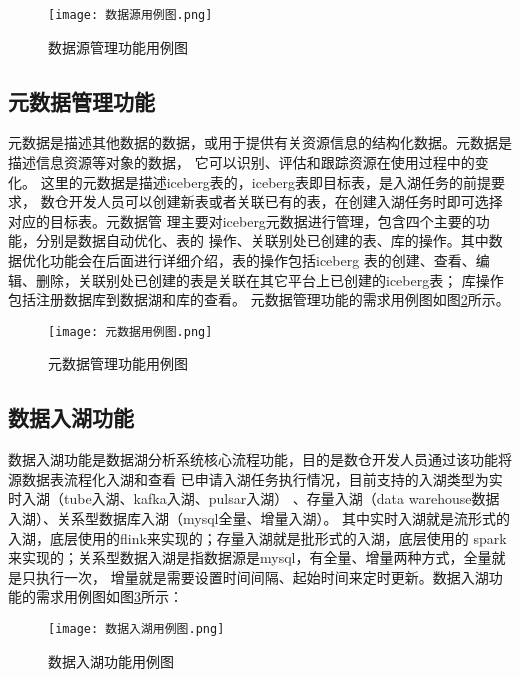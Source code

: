 \begin{figure}[H]
  \centering
  \texttt{[image: 数据源用例图.png]}
  \caption{数据源管理功能用例图}
  \label{fig:数据源用例图}
\end{figure}

\subsection{元数据管理功能}

元数据是描述其他数据的数据，或用于提供有关资源信息的结构化数据。元数据是描述信息资源等对象的数据，
它可以识别、评估和跟踪资源在使用过程中的变化\cite{15}。
这里的元数据是描述iceberg表的，iceberg表即目标表，是入湖任务的前提要求，
数仓开发人员可以创建新表或者关联已有的表，在创建入湖任务时即可选择对应的目标表。元数据管
理主要对iceberg元数据进行管理，包含四个主要的功能，分别是数据自动优化、表的
操作、关联别处已创建的表、库的操作。其中数据优化功能会在后面进行详细介绍，表的操作包括iceberg
表的创建、查看、编辑、删除，关联别处已创建的表是关联在其它平台上已创建的iceberg表；
库操作包括注册数据库到数据湖和库的查看。
元数据管理功能的需求用例图如图\ref{fig:元数据用例图}所示。

\begin{figure}[H]
  \centering
  \texttt{[image: 元数据用例图.png]}
  \caption{元数据管理功能用例图}
  \label{fig:元数据用例图}
\end{figure}

\subsection{数据入湖功能}

数据入湖功能是数据湖分析系统核心流程功能，目的是数仓开发人员通过该功能将源数据表流程化入湖和查看
已申请入湖任务执行情况，目前支持的入湖类型为实时入湖（tube入湖、kafka入湖、pulsar入湖）
、存量入湖（data warehouse数据入湖）、关系型数据库入湖（mysql全量、增量入湖）。
其中实时入湖就是流形式的入湖，底层使用的flink来实现的；存量入湖就是批形式的入湖，底层使用的
spark来实现的；关系型数据入湖是指数据源是mysql，有全量、增量两种方式，全量就是只执行一次，
增量就是需要设置时间间隔、起始时间来定时更新。数据入湖功能的需求用例图如图\ref{fig:数据入湖用例图}所示：

\begin{figure}[H]
  \centering
  \texttt{[image: 数据入湖用例图.png]}
  \caption{数据入湖功能用例图}
  \label{fig:数据入湖用例图}
\end{figure}

